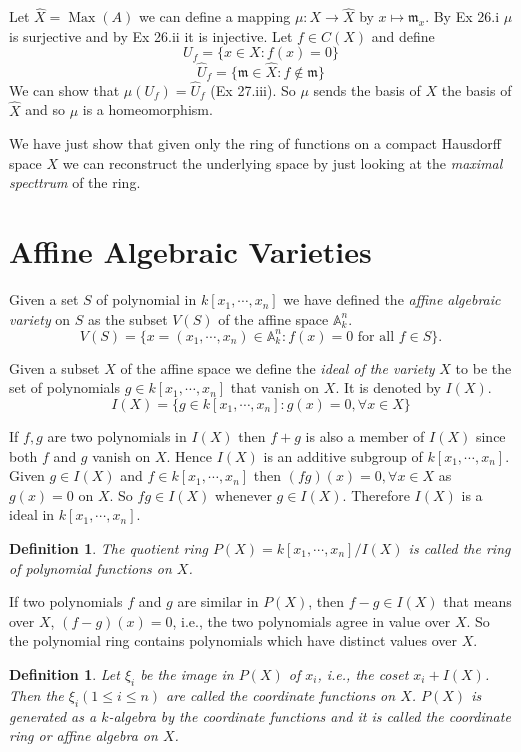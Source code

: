 \documentclass[]{report}
\newtheorem{defn}[theorem]{Definition}
\DeclareMathOperator\Max{Max}
\begin{document}
Let $\hat{X} = \Max(A)$ we can define a mapping $\mu: X\rightarrow \hat{X}$ by $x\mapsto \mathfrak{m}_x $. By Ex 26.i $\mu$ is surjective and by Ex 26.ii it is injective. Let $f\in C(X)$ and define
$$U_f = \{x\in X:f(x) = 0\}$$
$$\hat{U}_f = \{\mathfrak{m}\in \hat{X}:f\not\in \mathfrak{m}\}$$
We can show that $\mu(U_f) = \hat{U}_f$ (Ex 27.iii). So $\mu$ sends the basis of $X$ the basis of $\hat{X}$ and so $\mu$ is a homeomorphism.

We have just show that given only the ring of functions on a compact Hausdorff space $X$ we can reconstruct the underlying space by just looking at the \textit{maximal specttrum} of the ring.


\section{Affine Algebraic Varieties}

Given a set $S$ of polynomial in $k[x_1,\cdots,x_n]$ we have defined the \textit{affine algebraic variety} on $S$ as the subset $V(S)$ of the affine space $\mathbb{A}^n_k$.
$$V(S) = \{x = (x_1,\cdots,x_n) \in \mathbb{A}^n_k : f(x) = 0 \text{ for all } f \in S\}.$$

Given a subset $X$ of the affine space we define the \textit{ideal of the variety} $X$ to be the set of polynomials $g\in k[x_1,\cdots,x_n]$ that vanish on $X$. It is denoted by $I(X)$.
$$I(X) = \{g\in k[x_1,\cdots,x_n]: g(x) = 0, \forall x\in X\}$$

If $f,g$ are two polynomials in $I(X)$ then $f+g$ is also a member of $I(X)$ since both $f$ and $g$ vanish on $X$. Hence $I(X)$ is an additive subgroup of $k[x_1, \cdots, x_n]$. Given $g \in I(X)$ and $f \in k[x_1, \cdots, x_n]$ then $(fg)(x) = 0, \forall x \in X$ as $g(x) = 0$ on $X$. So $fg \in I(X)$ whenever $g \in I(X)$. Therefore $I(X)$ is a ideal in $k[x_1, \cdots, x_n]$.

\begin{defn} 
    The quotient ring
    $P(X) = k[x_1,\cdots,x_n]/I(X)$
    is called the ring of polynomial functions on $X$. 
\end{defn}

If two polynomials $f$ and $g$ are similar in $P(X)$, then $f-g \in I(X)$ that means over $X$, $(f-g)(x) = 0$, i.e., the two polynomials agree in value over $X$. So the polynomial ring contains polynomials which have distinct values over $X$.

\begin{defn}
    Let $\xi_i$ be the image in $P(X)$ of $x_i$, i.e., the coset $x_i + I(X)$. Then the $\xi_i (1\leq i\leq n)$ are called the \textit{coordinate functions} on $X$. $P(X)$ is generated as a $k$-algebra by the \textit{coordinate functions} and it is called the \textit{coordinate ring} or \textit{affine algebra} on $X$.
\end{defn}
\end{document}
